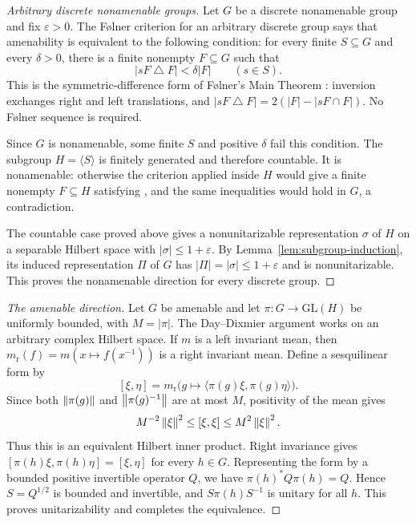 \begin{proof}[Arbitrary discrete nonamenable groups]
Let \(G\) be a discrete nonamenable group and fix \(\varepsilon>0\).
The F\o lner criterion for an arbitrary discrete group says that
amenability is equivalent to the following condition: for every finite
\(S\subseteq G\) and every \(\delta>0\), there is a finite nonempty
\(F\subseteq G\) such that
\begin{equation}\label{eq:folner-finite-test}
 |sF\mathbin\triangle F|<\delta|F|\qquad(s\in S).
\end{equation}
This is the symmetric-difference form of F\o lner's Main Theorem
\cite[p.~245]{Folner1955}: inversion exchanges right and left
translations, and \(|sF\mathbin\triangle F|=2(|F|-|sF\cap F|)\).
No F\o lner sequence is required.

Since \(G\) is nonamenable, some finite \(S\) and positive \(\delta\)
fail this condition. The subgroup \(H=\langle S\rangle\) is finitely
generated and therefore countable. It is nonamenable: otherwise the
criterion applied inside \(H\) would give a finite nonempty
\(F\subseteq H\) satisfying , and the same
inequalities would hold in \(G\), a contradiction.

The countable case proved above gives a nonunitarizable
representation \(\sigma\) of \(H\) on a separable Hilbert space with
\(|\sigma|\le1+\varepsilon\). By Lemma~\ref{lem:subgroup-induction}, its
induced representation \(\Pi\) of \(G\) has
\(|\Pi|=|\sigma|\le1+\varepsilon\) and is nonunitarizable. This proves
the nonamenable direction for every discrete group.
\end{proof}

\begin{proof}[The amenable direction]
Let \(G\) be amenable and let \(\pi:G\to\mathrm{GL}(H)\) be uniformly
bounded, with \(M=|\pi|\). The Day--Dixmier argument
\cite{Day1950,Dixmier1950} works on an arbitrary complex Hilbert space.
If \(m\) is a left invariant mean, then
\(m_{\mathrm r}(f)=m(x\mapsto f(x^{-1}))\) is a right invariant mean.
Define a sesquilinear form by
\[
 [\xi,\eta]=m_{\mathrm r}\bigl(g\mapsto
                 \langle\pi(g)\xi,\pi(g)\eta\rangle\bigr).
\]
Since both \(\left\lVert\pi(g)\right\rVert\) and \(\left\lVert\pi(g)^{-1}\right\rVert\) are at most
\(M\), positivity of the mean gives
\[
 M^{-2}\left\lVert\xi\right\rVert^2\le[\xi,\xi]\le M^2\left\lVert\xi\right\rVert^2.
\]
Thus this is an equivalent Hilbert inner product. Right invariance
gives \([\pi(h)\xi,\pi(h)\eta]=[\xi,\eta]\) for every \(h\in G\).
Representing the form by a bounded positive invertible operator \(Q\),
we have \(\pi(h)^*Q\pi(h)=Q\). Hence \(S=Q^{1/2}\) is bounded and
invertible, and \(S\pi(h)S^{-1}\) is unitary for all \(h\). This proves
unitarizability and completes the equivalence.
\end{proof}

